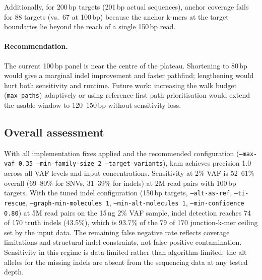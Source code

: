 Additionally, for 200\,bp targets (201\,bp actual sequences), anchor coverage
fails for 88 targets (vs.\ 67 at 100\,bp) because the anchor k-mers at the
target boundaries lie beyond the reach of a single 150\,bp read.

\paragraph{Recommendation.}
The current 100\,bp panel is near the centre of the plateau.
Shortening to 80\,bp would give a marginal indel improvement and faster
pathfind; lengthening would hurt both sensitivity and runtime.
Future work: increasing the walk budget (\texttt{max\_paths}) adaptively or
using reference-first path prioritisation would extend the usable window to
120--150\,bp without sensitivity loss.

\subsection{Overall assessment}

With all implementation fixes applied and the recommended configuration
(\texttt{--max-vaf 0.35 --min-family-size 2 --target-variants}), kam achieves
precision 1.0 across all VAF levels and input concentrations.
Sensitivity at 2\% VAF is 52--61\% overall (69--80\% for SNVs, 31--39\% for
indels) at 2M read pairs with 100\,bp targets.
With the tuned indel configuration (150\,bp targets, \texttt{--alt-as-ref},
\texttt{--ti-rescue}, \texttt{--graph-min-molecules 1},
\texttt{--min-alt-molecules 1}, \texttt{--min-confidence 0.80}) at 5M read
pairs on the 15\,ng 2\% VAF sample, indel detection reaches 74 of 170 truth
indels (43.5\%), which is 93.7\% of the 79 of 170 junction-k-mer ceiling set
by the input data.
The remaining false negative rate reflects coverage limitations and structural
indel constraints, not false positive contamination.
Sensitivity in this regime is data-limited rather than algorithm-limited: the
alt alleles for the missing indels are absent from the sequencing data at any
tested depth.
